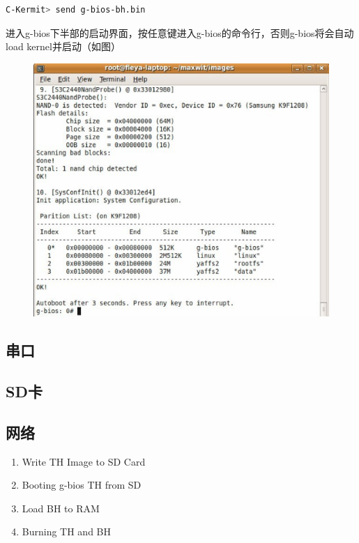 \begin{lstlisting}[language=bash,numbers=none]
C-Kermit> send g-bios-bh.bin
\end{lstlisting}
进入g-bios下半部的启动界面，按任意键进入g-bios的命令行，否则g-bios将会自动load kernel并启动（如图）

\begin{figure}[H]
\centering
\includegraphics[width=5in]{image/step4.eps}
\end{figure}

\subsection{串口}
\subsection{SD卡}
\subsection{网络}

\begin{enumerate}
\item Write TH Image to SD Card
\item Booting g-bios TH from SD
\item Load BH to RAM
\item Burning TH and BH
\end{enumerate}
